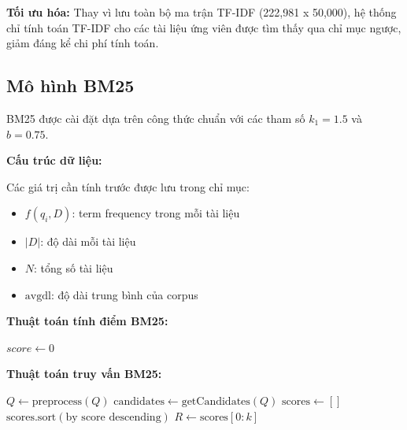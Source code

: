\documentclass[../BTL.tex]{subfiles}
\begin{document}
\textbf{Tối ưu hóa:} Thay vì lưu toàn bộ ma trận TF-IDF (222,981 x 50,000), hệ thống chỉ tính toán TF-IDF cho các tài liệu ứng viên được tìm thấy qua chỉ mục ngược, giảm đáng kể chi phí tính toán.


\subsection{Mô hình BM25}

BM25 được cài đặt dựa trên công thức chuẩn với các tham số $k_1 = 1.5$ và $b = 0.75$.

\textbf{Cấu trúc dữ liệu:}

Các giá trị cần tính trước được lưu trong chỉ mục:
\begin{itemize}
    \item $f(q_i, D)$: term frequency trong mỗi tài liệu
    \item $|D|$: độ dài mỗi tài liệu
    \item $N$: tổng số tài liệu
    \item $\text{avgdl}$: độ dài trung bình của corpus
\end{itemize}

\textbf{Thuật toán tính điểm BM25:}

\begin{algorithm}[H]
\caption{ScoreBM25}
\SetAlgoLined
{}
$score \leftarrow 0$\;
\end{algorithm}

\textbf{Thuật toán truy vấn BM25:}

\begin{algorithm}[H]
\caption{QueryBM25}
\SetAlgoLined
{}
$Q \leftarrow \text{preprocess}(Q)$\;
$\text{candidates} \leftarrow \text{getCandidates}(Q)$\;
$\text{scores} \leftarrow []$\;
$\text{scores}.\text{sort}(\text{by score descending})$\;
$R \leftarrow \text{scores}[0:k]$\;
\end{algorithm}
\end{document}
